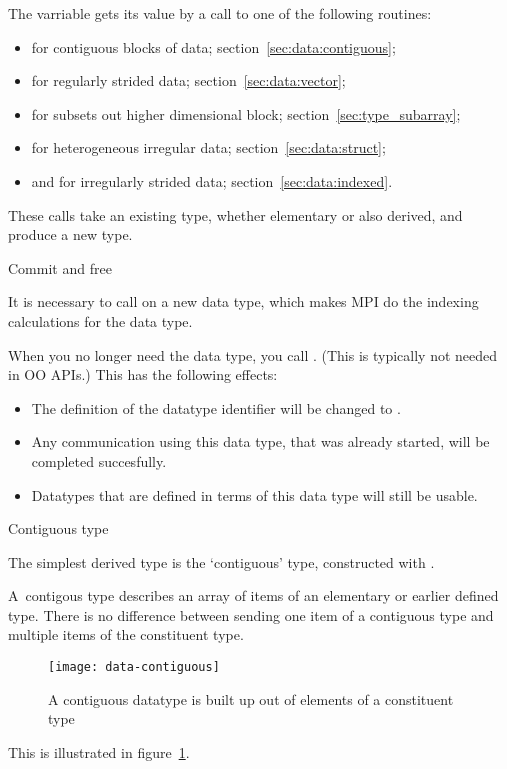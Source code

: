 The  varriable gets its value by a call to
one of the following routines:
\begin{itemize}
\item {} for contiguous blocks of
  data; section~\ref{sec:data:contiguous};
\item {} for regularly strided data;
  section~\ref{sec:data:vector};
\item {} for subsets out higher
  dimensional block; section~\ref{sec:type_subarray};
\item {} for heterogeneous irregular data;
  section~\ref{sec:data:struct};
\item {} and
   for irregularly strided data;
  section~\ref{sec:data:indexed}.
\end{itemize}
These calls take an existing type, whether elementary or also derived,
and produce a new type.

 {Commit and free}

It is necessary to call  on a new data
type, which makes MPI do the indexing calculations for the data type.

When you no longer
need the data type, you call .
(This is typically not needed in \ac{OO} \acp{API}.)
This has the following effects:
\begin{itemize}
\item The definition of the datatype identifier will be changed to
  .
\item Any communication using this data type, that was already
  started, will be completed succesfully.
\item Datatypes that are defined in terms of this data type will still
  be usable.
\end{itemize}

 {Contiguous type}
\label{sec:data:contiguous}

The simplest derived type is the `contiguous' type,
constructed with .

A~contigous type describes an array of items
of an elementary or earlier defined type. There is no difference between sending
one item of a contiguous type and multiple items of the constituent type.
\begin{figure}[t]
  \texttt{[image: data-contiguous]}
  \caption{A contiguous datatype is built up out of elements of a constituent type}
  \label{fig:data-contiguous}
\end{figure}
This is illustrated in figure~\ref{fig:data-contiguous}.

